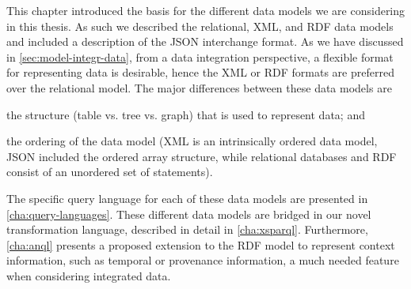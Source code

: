 This chapter introduced the basis for the different data models we are considering in this thesis.  As such we described
the relational, \ac{XML}, and \ac{RDF} data models and included a description of the \ac{JSON} interchange format.
%
As we have discussed in \cref{sec:model-integr-data}, from a data integration perspective, a flexible format for
representing data is desirable, hence the \ac{XML} or \ac{RDF} formats are preferred over the relational model.
%
The major differences between these data models are 
\begin{inparaenum}[(i)]
\item the structure (table vs. tree vs. graph) that is used to represent data; and
\item the ordering of the data model (\ac{XML} is an intrinsically ordered data model, \ac{JSON} included the ordered
  array structure, while relational databases and \ac{RDF} consist of an unordered set of statements).
\end{inparaenum}


The specific query language for each of these data models are presented in \cref{cha:query-languages}.
%
These different data models are bridged in our novel transformation language, described in detail in
\cref{cha:xsparql}.
%
Furthermore, \cref{cha:anql} presents a proposed extension to the \ac{RDF} model to represent context
information, such as temporal or provenance information, a much needed feature when considering integrated data.





